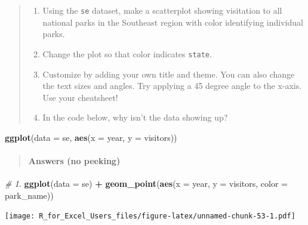 \documentclass[]{book}
\newenvironment{Shaded}{\begin{snugshade}}{\end{snugshade}}
\newcommand{\CommentTok}[1]{\textcolor[rgb]{0.56,0.35,0.01}{\textit{#1}}}
\newcommand{\DataTypeTok}[1]{\textcolor[rgb]{0.13,0.29,0.53}{#1}}
\newcommand{\KeywordTok}[1]{\textcolor[rgb]{0.13,0.29,0.53}{\textbf{#1}}}
\newcommand{\NormalTok}[1]{#1}
\newcommand{\OperatorTok}[1]{\textcolor[rgb]{0.81,0.36,0.00}{\textbf{#1}}}
\newcommand{\StringTok}[1]{\textcolor[rgb]{0.31,0.60,0.02}{#1}}
\providecommand{\tightlist}{%
  \setlength{\itemsep}{0pt}\setlength{\parskip}{0pt}}
\let\oldparagraph\paragraph
\renewcommand{\paragraph}[1]{\oldparagraph{#1}\mbox{}}
\begin{document}
\begin{quote}
\begin{enumerate}
\def\labelenumi{\arabic{enumi}.}
\tightlist
\item
  Using the \texttt{se} dataset, make a scatterplot showing visitation to all national parks in the Southeast region with color identifying individual parks.
\item
  Change the plot so that color indicates \texttt{state}.
\item
  Customize by adding your own title and theme. You can also change the text sizes and angles. Try applying a 45 degree angle to the x-axis. Use your cheatsheet!
\item
  In the code below, why isn't the data showing up?
\end{enumerate}
\end{quote}

\begin{Shaded}
\begin{Highlighting}[]
\KeywordTok{ggplot}\NormalTok{(}\DataTypeTok{data =}\NormalTok{ se, }\KeywordTok{aes}\NormalTok{(}\DataTypeTok{x =}\NormalTok{ year, }\DataTypeTok{y =}\NormalTok{ visitors))}
\end{Highlighting}
\end{Shaded}

\begin{quote}
\mbox{}%
\hypertarget{answers-no-peeking}{%
\paragraph{Answers (no peeking)}\label{answers-no-peeking}}
\end{quote}

\begin{Shaded}
\begin{Highlighting}[]
\CommentTok{# 1.}
\KeywordTok{ggplot}\NormalTok{(}\DataTypeTok{data =}\NormalTok{ se) }\OperatorTok{+}
\StringTok{  }\KeywordTok{geom_point}\NormalTok{(}\KeywordTok{aes}\NormalTok{(}\DataTypeTok{x =}\NormalTok{ year, }\DataTypeTok{y =}\NormalTok{ visitors, }\DataTypeTok{color =}\NormalTok{ park_name))}
\end{Highlighting}
\end{Shaded}

\texttt{[image: R\_for\_Excel\_Users\_files/figure-latex/unnamed-chunk-53-1.pdf]}
\end{document}
